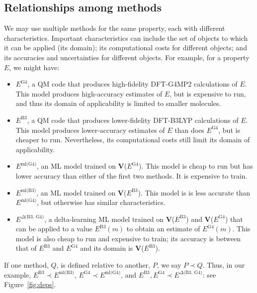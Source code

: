 \documentclass[10pt]{article}
\begin{document}
\subsection{Relationships among methods}

We may use multiple methods for the same property, each with different characteristics.
Important characteristics can include the set of objects to which it can be applied (its domain); 
its computational costs for different objects; and its accuracies and uncertainties for different objects.
For example, for a property $E$, we might have:

\begin{itemize}\itemsep-0.2em 
\item
$E^{\textrm{G4}}$, a QM code that produces high-fidelity DFT-G4MP2 calculations of $E$. 
This model produces high-accuracy estimates of $E$, but is expensive to run, and thus its domain of applicability is limited to smaller molecules.
\item
$E^{\textrm{B3}}$, a QM code that produces lower-fidelity DFT-B3LYP calculations of $E$. This model produces lower-accuracy estimates of $E$ than
does $E^{\textrm{G4}}$, but is cheaper to run. Nevertheless, its computational costs still limit its domain of applicability.
\item
$E^{\textrm{ml(G4)}}$, an ML model trained on \textbf{V}($E^{\textrm{G4}}$).
This model is cheap to run but has lower accuracy than either of the first two methods. It is expensive to train.
\item
$E^{\textrm{ml(B3)}}$, an ML model trained on \textbf{V}($E^{\textrm{B3}}$).
This model is is less accurate than $E^{\textrm{ml(G4)}}$, but otherwise has similar characteristics.
\item
$E^{\textrm{$\Delta$(B3, G4)}}$, a delta-learning ML model trained on \textbf{V}($E^{\textrm{B3}}$) and  \textbf{V}($E^{\textrm{G4}}$) 
that can be applied to a value $E^{\textrm{B3}}(m)$ to obtain an estimate of $E^{\textrm{G4}}(m)$.
This model is also cheap to run and expensive to train; its accuracy is between that of $E^{\textrm{B3}}$ and $E^{\textrm{G4}}$ and its domain is \textbf{V}($E^{\textrm{B3}}$).
\end{itemize}

If one method, $Q$, is defined relative to another, $P$, we say $P\prec Q$.
Thus, in our example,
$E^{\textrm{B3}} \prec E^{\textrm{ml(B3)}}$, $E^{\textrm{G4}} \prec E^{\textrm{ml(G4)}}$, and
$E^{\textrm{B3}}, E^{\textrm{G4}} \prec E^{\textrm{$\Delta$(B3, G4)}}$: see Figure~\ref{fig:deps}.
\end{document}
